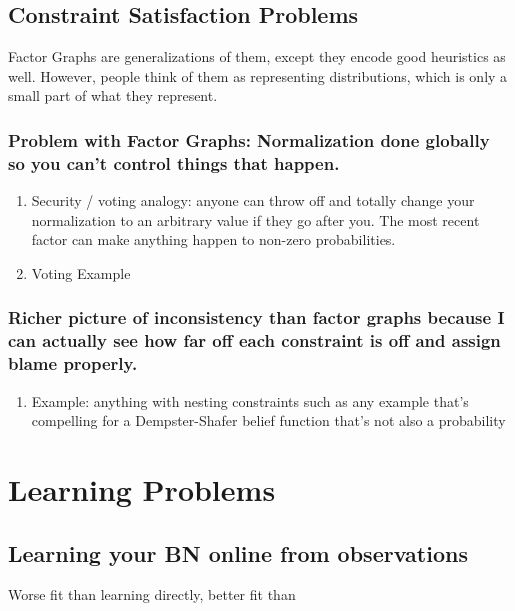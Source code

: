 \documentclass[11pt]{article}
\begin{document}
\subsection{Constraint Satisfaction Problems}
\label{sec:orgc245b4d}
Factor Graphs are generalizations of them, except they encode good heuristics as well. However, people think of them as representing distributions, which is only a small part of what they represent. 

\subsubsection{Problem with Factor Graphs: Normalization done globally so you can't control things that happen.}
\label{sec:orga557052}
\begin{enumerate}
\item Security / voting analogy:
\label{sec:org4c02452}
anyone can throw off and totally change your normalization to an arbitrary value if they go after you. The most recent factor can make anything happen to non-zero probabilities. 

\item Voting Example
\label{sec:orgf70c2f8}
\end{enumerate}

\subsubsection{Richer picture of inconsistency than factor graphs because I can actually see how far off each constraint is off and assign blame properly.}
\label{sec:orgdaf476c}

\begin{enumerate}
\item Example: anything with nesting constraints
\label{sec:orga95eee7}
such as any example that's compelling for a  Dempster-Shafer belief function that's not also a probability
\end{enumerate}

\section{Learning Problems}
\label{sec:org46cafc1}

\subsection{Learning your BN online from observations}
\label{sec:org23eb6d8}
Worse fit than learning directly, better fit than 
\end{document}
